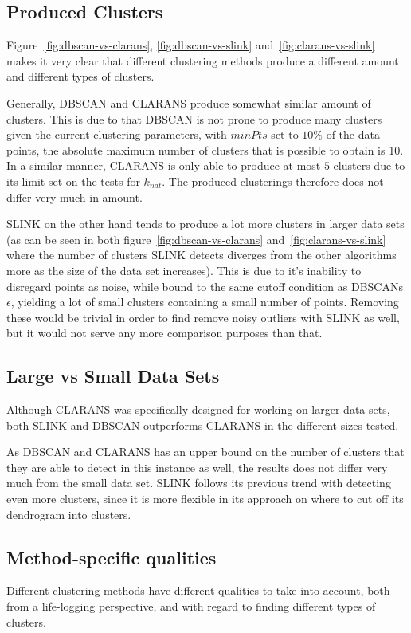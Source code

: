 \subsection{Produced Clusters}
Figure~\ref{fig:dbscan-vs-clarans}, \ref{fig:dbscan-vs-slink} 
and~\ref{fig:clarans-vs-slink} makes it very clear that different clustering
methods produce a different amount and different types of clusters. 

Generally, DBSCAN and CLARANS produce somewhat similar amount of clusters. 
This is due to that DBSCAN is not prone to produce many clusters given the
current clustering parameters, with $minPts$ set to $10\%$ of the data 
points, the absolute maximum number of clusters that is possible to obtain
is 10. In a similar manner, CLARANS is only able to produce at most 
$5$ clusters due to its limit set on the tests for $k_{nat}$. The produced
clusterings therefore does not differ very much in amount.

SLINK on the other hand tends to produce a lot more clusters in larger data
sets (as can be seen in both figure~\ref{fig:dbscan-vs-clarans} 
and~\ref{fig:clarans-vs-slink} where the number of clusters SLINK detects
diverges from the other algorithms more as the size of the data set increases). 
This is due to it's inability to disregard points as noise, while
bound to the same cutoff condition as DBSCANs $\epsilon$, yielding a lot
of small clusters containing a small number of points. Removing these would
be trivial in order to find remove noisy outliers with SLINK as well, but 
it would not serve any more comparison purposes than that.

\subsection{Large vs Small Data Sets}
Although CLARANS was specifically designed for working on larger data sets, 
both SLINK and DBSCAN outperforms CLARANS in the different sizes tested. 

As DBSCAN and CLARANS has an upper bound on the number of clusters that they
are able to detect in this instance as well, the results does not differ 
very much from the small data set. SLINK follows its previous trend 
with detecting even more clusters, since it is more flexible in its approach
on where to cut off its dendrogram into clusters.

\subsection{Method-specific qualities}
Different clustering methods have different qualities to take into account, 
both from a life-logging perspective, and with regard to finding different
types of clusters. 

